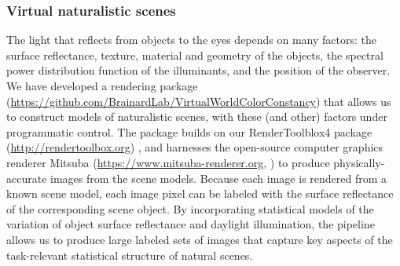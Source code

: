 \documentclass{jov}
\begin{document}
\subsubsection{Virtual naturalistic scenes}
The light that reflects from objects to the eyes depends on many factors: the surface reflectance, texture, material and geometry of the objects, 
the spectral power distribution function of the illuminants, and the position of the observer.
We have developed a rendering package 
(\href{https://github.com/BrainardLab/VirtualWorldColorConstancy}{https://github.com/BrainardLab/VirtualWorldColorConstancy}) 
that allows us to construct models of naturalistic scenes, with these (and other) factors under programmatic control.
The package builds on our RenderToolblox4 package (\href{http://rendertoolbox.org}{http://rendertoolbox.org}) \cite{heasly2014rendertoolbox3},
and harnesses the open-source computer graphics renderer Mitsuba (\href{https://www.mitsuba-renderer.org}{https://www.mitsuba-renderer.org}, 
) to produce physically-accurate images from the scene models.
Because each image is rendered from a known scene model, each image pixel can be labeled with 
the surface reflectance of the corresponding scene object.
By incorporating statistical models of the variation of object surface reflectance and daylight illumination, 
the pipeline allows us to produce large labeled sets of images that capture key aspects of the task-relevant 
statistical structure of natural scenes.
\end{document}
